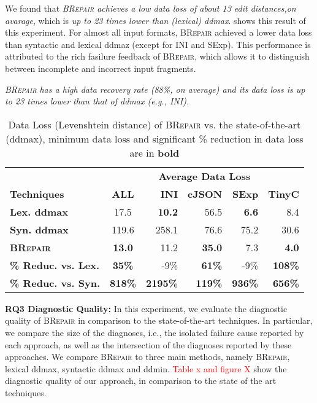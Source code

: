 \documentclass[sigconf,review,anonymous]{acmart}
\newenvironment{result}{\begin{framed}\centering\it}{\end{framed}}
\newcommand{\recheck}[1]{\textcolor{red}{#1}}
\newcommand{\approach}{\textsc{BRepair}\xspace}
\begin{document}
We found that \textit{\approach achieves a low data loss of about 13 edit distances,on avarage},  which is \textit{up to 23 times lower than (lexical) ddmax}.  shows this result of this experiment. For almost all input formats, \approach achieved a lower data loss than syntactic and lexical ddmaz (except for INI and SExp). This performance is attributed to the rich fasilure feedback of \approach, which allows it to distinguish between incomplete and incorrect input fragments.

\begin{result}
\approach has a high data recovery rate (88\%, on average) and its data %
loss is up to 23 times lower than that of ddmax (e.g., INI).
\end{result}


\begin{table}[!tbp]\centering
\caption{Data Loss (Levenshtein distance) of \approach vs. the state-of-the-art (ddmax), minimum data loss and significant \% reduction in data loss are in \textbf{bold}}
\begin{tabular}{|l | c | r  r  r  r |}
\hline
&  \multicolumn{5}{c|}{\textbf{Average Data Loss }}  \\
\textbf{Techniques} & \textbf{ALL} & \textbf{INI} & \textbf{cJSON} & \textbf{SExp} & \textbf{TinyC} \\
\hline
\textbf{Lex. ddmax} & 17.5 & \textbf{10.2} &	56.5 &	\textbf{6.6} &	 8.4 \\	
\textbf{Syn. ddmax} & 119.6 &  258.1 & 76.6 &	75.2 &	30.6 \\
\textbf{\approach} & \textbf{13.0}  & 11.2 &	\textbf{35.0} &	7.3 & \textbf{4.0} \\
\hline
\textbf{\% Reduc. vs. Lex.} & \textbf{35\%} &  -9\% & \textbf{61\%} & -9\% & \textbf{108\%} \\
\textbf{\% Reduc. vs. Syn.} & \textbf{818\%} & \textbf{2195\%} &	\textbf{119\%} & \textbf{936\%} &\textbf{ 656\%} \\
\hline
\end{tabular}
\label{tab:data-loss}
\end{table}


\noindent
\textbf{RQ3 Diagnostic Quality:}
In this experiment, we evaluate the diagnostic quality of \approach in comparison to the state-of-the-art techniques. In particular, we compare the size of the diagnoses, i.e., the isolated failure cause reported by each approach, as well as the intersection of the diagnoses reported by these approaches. We compare \approach to three main methods, namely \approach, lexical ddmax, syntactic ddmax and ddmin.  \recheck{Table x and figure X} show the diagnostic quality of our approach, in comparison to the state of the art techniques.
\end{document}

